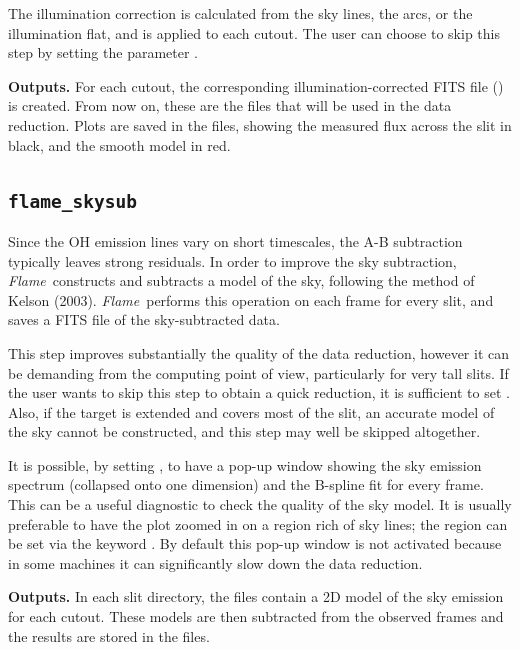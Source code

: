 \documentclass[a4paper]{article}
\newcommand{\flame}{\emph{Flame}}
\begin{document}
\begin{sloppypar}
The illumination correction is calculated from the sky lines, the arcs, or the illumination flat, and is applied to each cutout. The user can choose to skip this step by setting the parameter .

\medskip
\noindent
\textbf{Outputs.} For each cutout, the corresponding illumination-corrected FITS file () is created. From now on, these are the files that will be used in the data reduction. Plots are saved in the  files, showing the measured flux across the slit in black, and the smooth model in red.



\subsection{\texttt{flame\_skysub}}
\label{sec:skysub}

Since the OH emission lines vary on short timescales, the A-B subtraction typically leaves strong residuals. In order to improve the sky subtraction, \flame\ constructs and subtracts a model of the sky, following the method of Kelson (2003). \flame\ performs this operation on each frame for every slit, and saves a FITS file of the sky-subtracted data.

This step improves substantially the quality of the data reduction, however it can be demanding from the computing point of view, particularly for very tall slits. If the user wants to skip this step to obtain a quick reduction, it is sufficient to set . Also, if the target is extended and covers most of the slit, an accurate model of the sky cannot be constructed, and this step may well be skipped altogether.

It is possible, by setting , to have a pop-up window showing the sky emission spectrum (collapsed onto one dimension) and the B-spline fit for every frame. This can be a useful diagnostic to check the quality of the sky model. It is usually preferable to have the plot zoomed in on a region rich of sky lines; the region can be set via the keyword . By default this pop-up window is not activated because in some machines it can significantly slow down the data reduction.


\medskip
\noindent
\textbf{Outputs.} In each slit directory, the  files contain a 2D model of the sky emission for each cutout. These models are then subtracted from the observed frames and the results are stored in the  files.



\end{sloppypar}
\end{document}
